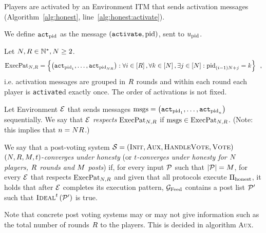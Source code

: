 \documentclass[a4paper,english,cleveref, autoref]{oasics-v2019}
\begin{document}
    \noindent Players are activated by an Environment ITM that sends activation
    messages (Algorithm~\ref{alg:honest}, line~\ref{alg:honest:activate}).

\begin{definition}
  We define $\mathtt{act}_{\mathrm{pid}}$ as the message $\left(\mathtt{activate},
  \mathrm{pid}\right)$, sent to $u_{\mathrm{pid}}$.
\end{definition}
\begin{definition}
  \label{model:def:execpat}
  Let $N, R \in \mathbb{N}^*, N \geq 2$.
  \begin{equation*}
    \mathrm{ExecPat}_{N, R} = \left\{\left(\mathtt{act}_{\mathrm{pid}_1}, \dots,
    \mathtt{act}_{\mathrm{pid}_{N R}}\right) : \forall i \in
    \left[R\right], \forall k \in \left[N\right], \exists j \in
    \left[N\right]: \mathrm{pid}_{(i - 1) N + j} = k\right\} \enspace,
  \end{equation*}
  i.e. activation messages are grouped in $R$ rounds and within each round
  each player is \texttt{activate}d exactly once. The order of activations is
  not fixed.

  Let Environment $\mathcal{E}$ that sends messages $\mathrm{msgs} =
  \left(\mathtt{act}_{\mathrm{pid}_1}, \dots, \mathtt{act}_{\mathrm{pid}_n}\right)$
  sequentially. We say that \emph{$\mathcal{E}$ respects $\mathrm{ExecPat}_{N,
  R}$} if $\mathrm{msgs} \in \mathrm{ExecPat}_{N, R}$. (Note: this
  implies that $n = N R$.)
\end{definition}
\begin{definition}
  We say that a post-voting system $\mathcal{S} = \left(\textsc{Init}, \textsc{Aux},
  \textsc{HandleVote}, \textsc{Vote}\right)$ $\left(N, R,
  M, t\right)$-\emph{converges under honesty} (or \emph{$t$-converges
  under honesty for $N$ players, $R$ rounds and $M$
  posts}) if, for every input $\mathcal{P}$ such that $|\mathcal{P}| = M$,
  for every $\mathcal{E}$ that respects $\mathrm{ExecPat}_{N, R}$ and given that
  all protocols execute $\Pi_{\mathrm{honest}}$, it holds that after $\mathcal{E}$ completes its
  execution pattern, $\mathcal{G}_{\mathrm{Feed}}$ contains a post list $\mathcal{P}'$ such that
  $\textsc{Ideal}^t\left(\mathcal{P}'\right)$ is true.
\end{definition}

    \noindent Note that concrete post voting systems may or may not give
    information such as the total number of rounds $R$ to the players.
    This is decided in algorithm \textsc{Aux}.
\end{document}
